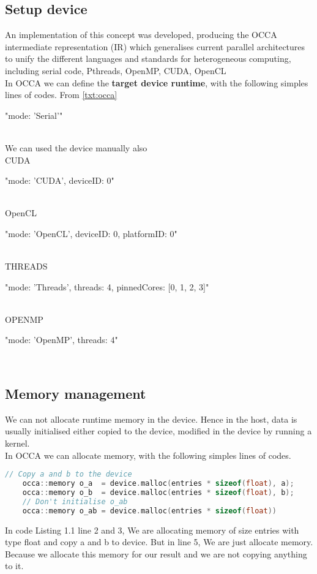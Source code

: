 \subsection {Setup device}
An implementation of this concept was developed, producing the OCCA intermediate representation (IR) which generalises current parallel architectures to unify the different languages and standards for heterogeneous computing, including serial code, Pthreads, OpenMP, CUDA, OpenCL \\



In OCCA we can define the \textbf{target device runtime}, with the following simples lines of codes. From \ref{txt:occa}  \\
\centerline{"mode: 'Serial'"}\\
We can used the device manually also\\
CUDA  \centerline{"mode: 'CUDA', deviceID: 0"}\\
OpenCL  \centerline{"mode: 'OpenCL', deviceID: 0, platformID: 0"}\\
THREADS  \centerline{"mode: 'Threads', threads: 4, pinnedCores: [0, 1, 2, 3]"}\\
OPENMP  \centerline{"mode: 'OpenMP', threads: 4"}  \\

\subsection{Memory management}
We can not allocate runtime memory in the device. Hence in the host, data is usually initialised either copied to the device, modified in the device by running a kernel.\\

In OCCA we can allocate memory, with the following simples lines of codes. \\
\begin{lstlisting}[language=C, caption=allocating memory to the device]
	// Copy a and b to the device
	occa::memory o_a  = device.malloc(entries * sizeof(float), a);
	occa::memory o_b  = device.malloc(entries * sizeof(float), b);
	// Don't initialise o_ab
	occa::memory o_ab = device.malloc(entries * sizeof(float))
\end{lstlisting}
In code Listing 1.1 line 2 and 3, We are allocating memory of size entries with type float and copy a and b to device. But in line 5, We are just allocate memory. Because we allocate this memory for our result and we are not copying anything to it.
